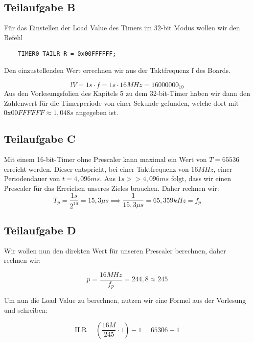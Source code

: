 \documentclass{report}
\begin{document}
\subsection{Teilaufgabe B}

Für das Einstellen der Load Value des Timers im 32-bit Modus wollen wir den Befehl
\begin{verbatim}
    TIMER0_TAILR_R = 0x00FFFFFF;
\end{verbatim}

Den einzustellenden Wert errechnen wir aus der Taktfrequenz f des Boards.

\begin{equation}
    lV = 1s \cdot f = 1s \cdot 16MHz = 16000000_{10}
\end{equation}
Aus den Vorlesungsfolien des Kapitels 5 zu dem 32-bit-Timer haben wir dann den Zahlenwert für die Timerperiode von einer Sekunde gefunden, welche dort mit $0\mathrm{x}00FFFFFF \approx 1,048s$ angegeben ist.

\subsection{Teilaufgabe C}

Mit einem 16-bit-Timer ohne Prescaler kann maximal ein Wert von $T = 65536$ erreicht werden. Dieser entspricht, bei einer Taktfrequenz von $16MHz$, einer Periodendauer von $t = 4,096 ms$. Aus $1s >> 4,096ms$ folgt, dass wir einen Prescaler für das Erreichen unseres Zieles brauchen. Daher rechnen wir:
\begin{equation}
    T_{p} = \frac{1s}{2^{16}} = 15,3\mu s \implies \frac{1}{15,3 \mu s} = 65,359kHz = f_p
\end{equation}

\subsection{Teilaufgabe D}

Wir wollen nun den direkten Wert für unseren Prescaler berechnen, daher rechnen wir:

\begin{equation}
    p = \frac{16MHz}{f_{p}} = 244,8 \approx 245
\end{equation}

Um nun die Load Value zu berechnen, nutzen wir eine Formel aus der Vorlesung und schreiben:

\begin{equation}
    \mathrm{ILR} = (\frac{16M}{245} \cdot 1) - 1 = 65306 - 1
\end{equation}
\end{document}
